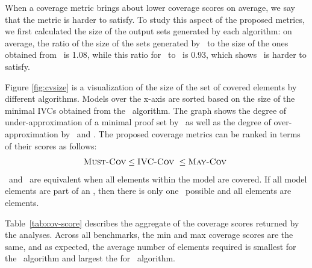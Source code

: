 When a coverage metric brings about lower coverage scores on average,
we say that the metric is harder to satisfy. To study this aspect of the proposed metrics, we first calculated the size of the output sets generated by each algorithm: on average, the ratio of the size of the sets generated by \ucalg\ to the size of the ones obtained from \ucbfalg\ is 1.08,
while this ratio for \mustalg\ to \ucbfalg\ is 0.93, which shows \mustalg\ is harder to satisfy.

Figure \ref{fig:cvsize} is a visualization of the size of the set of covered elements by different algorithms. Models over the x-axis are sorted based on the size of the minimal IVCs obtained from the \ucbfalg\ algorithm.  The graph shows the degree of under-approximation of a minimal proof set by \mustcov\ as well as the degree of over-approximation by \ucalg\ and \maycov.  The proposed coverage metrics can be ranked in terms of their scores as follows:
$$\mustcov \leq \ivccov\ \leq \maycov\ $$
\ivccov\ and \mustcov\ are equivalent when all elements within the model are covered.  If all model elements are part of an \mivc, then there is only one \mivc\ possible and all elements are \must elements.





Table~\ref{tab:cov-score} describes the aggregate of the coverage scores returned by the analyses.  Across all benchmarks, the min and max coverage scores are the same, and as expected, the average number of elements required is smallest for the \mustalg\ algorithm and largest the for \ucalg\ algorithm.

